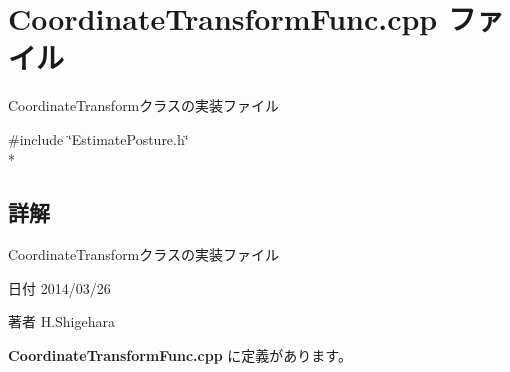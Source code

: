 \section{Coordinate\-Transform\-Func.\-cpp ファイル}
\label{_coordinate_transform_func_8cpp}


Coordinate\-Transformクラスの実装ファイル  


{\ttfamily \#include \char`\"{}Estimate\-Posture.\-h\char`\"{}}\\*


\subsection{詳解}
Coordinate\-Transformクラスの実装ファイル \begin{DoxyDate}{日付}
2014/03/26 
\end{DoxyDate}
\begin{DoxyAuthor}{著者}
H.\-Shigehara 
\end{DoxyAuthor}


 {\bf Coordinate\-Transform\-Func.\-cpp} に定義があります。

